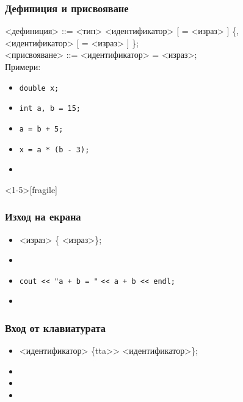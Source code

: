 \documentclass{beamer}
\begin{document}
\begin{frame}[fragile]
  \frametitle{Дефиниция и присвояване}
<дефиниция> ::= <тип>
<идентификатор> [ \tta= <израз> ] \{\tta,\\
\hspace{25ex}
<идентификатор> [ \tta= <израз> ] \}\tta;\\[2em]
<присвояване> ::= <идентификатор> \tta= <израз>\tta;\\[2em]
\pause
Примери:
\begin{itemize}
\item \lstinline{double x;}
\item \lstinline{int a, b = 15;}
\item \lstinline{a = b + 5;}
\item \lstinline{x = a * (b - 3);}
\item {}
\end{itemize}
\end{frame}

\begin{frame}<1-5>[fragile]
  \frametitle{Изход на екрана}

  \begin{itemize}
  \item {} <израз> \{\tta{<{}<} <израз>\}\tta;
  \item {}
  \item<4-> \lstinline{cout << "a + b = "} \lstinline{<< a + b << endl;}
  \item<5-> 
  \end{itemize}
\end{frame}

\begin{frame}
  \frametitle{Вход от клавиатурата}

  \begin{itemize}
  \item {} <идентификатор> \{tta{>{}>} <идентификатор>\}\tta;
  \item {}
  \item<4-> 
  \item<5-> 
  \end{itemize}
\end{frame}
\end{document}
